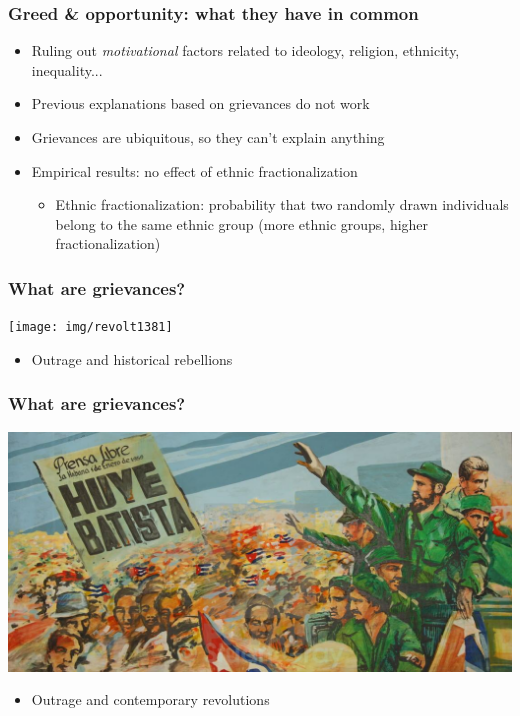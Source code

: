 \documentclass[aspectratio=43]{beamer}
\begin{document}
\begin{frame}
\frametitle{Greed \& opportunity: what they have in common}
\centering

\begin{itemize}
  \item Ruling out \textit{motivational} factors related to ideology, religion, ethnicity, inequality...
  \item Previous explanations based on grievances do not work
  \item Grievances are ubiquitous, so they can't explain anything
  \item Empirical results: no effect of ethnic fractionalization
  \begin{itemize}
    \item Ethnic fractionalization: probability that two randomly drawn individuals belong to the same ethnic group (more ethnic groups, higher fractionalization)
  \end{itemize}
\end{itemize}

\end{frame}

\begin{frame}
\frametitle{What are grievances?}
\centering

\texttt{[image: img/revolt1381]}

\begin{itemize}
  \item Outrage and historical rebellions
\end{itemize}

\end{frame}

\begin{frame}
\frametitle{What are grievances?}
\centering

\includegraphics[width = \textwidth]{img/cuba}

\begin{itemize}
  \item Outrage and contemporary revolutions
\end{itemize}

\end{frame}
\end{document}
